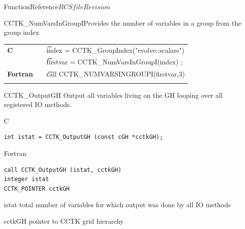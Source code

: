 \begin{cactuspart}{FunctionReference}{$RCSfile$}{$Revision$}
\begin{CCTKFunc}{CCTK\_NumVarsInGroupI}{Provides the number of variables in a group from the group index}
\label{CCTK-NumVarsInGroupI}
\showargs
\begin{params}
\end{params}
\begin{discussion}

\end{discussion}
\begin{examples}
\begin{tabular}{@{}p{3cm}cp{11cm}}
\hfill {\bf C} && {\t index = CCTK\_GroupIndex("evolve::scalars")}\\
               &&{\t firstvar = CCTK\_NumVarsInGroupI(index) ;}
\\
\hfill {\bf Fortran} && {\t call CCTK\_NUMVARSINGROUPI(firstvar,3)}\\
\\
\end{tabular}
\end{examples}
\begin{errorcodes}
\end{errorcodes}
\end{CCTKFunc}








\begin{FunctionDescription}{CCTK\_OutputGH}
\label{CCTK-OutputGH}
Output all variables living on the GH looping over all registered IO methods.

\begin{SynopsisSection}
\begin{Synopsis}{C}
\begin{verbatim}
int istat = CCTK_OutputGH (const cGH *cctkGH);
\end{verbatim}
\end{Synopsis}
\begin{Synopsis}{Fortran}
\begin{verbatim}
call CCTK_OutputGH (istat, cctkGH)
integer istat
CCTK_POINTER cctkGH
\end{verbatim}
\end{Synopsis}
\end{SynopsisSection}

\begin{ParameterSection}
\begin{Parameter}{istat}
total number of variables for which output was done by all IO methods
\end{Parameter}
\begin{Parameter}{cctkGH}
pointer to CCTK grid hierarchy
\end{Parameter}
\end{ParameterSection}


\end{FunctionDescription}
\end{cactuspart}
